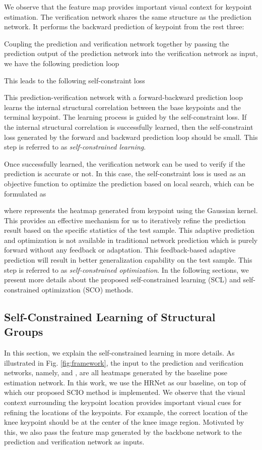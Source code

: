 \documentclass[runningheads]{llncs}
\begin{document}
We observe that the feature map   provides important visual context for keypoint estimation.
The verification network  shares the same structure as the prediction network. It performs the backward prediction of keypoint  from the rest three:

Coupling the prediction and verification network together by passing the 
prediction output  of the prediction network into the verification network as input, we have the following prediction loop

This leads to the following self-constraint loss

This  prediction-verification network with a forward-backward prediction loop
learns the internal structural correlation between the base keypoints and the terminal keypoint. The learning process is guided by the self-constraint loss. If the internal structural correlation is successfully learned, then the self-constraint loss 
 generated by the forward and backward prediction loop should be small. 
This step is referred to as \textit{self-constrained learning}.

Once successfully learned, the verification network  can be used to verify if the prediction  is accurate or not. 
In this case, the self-constraint loss is used as an objective function to optimize the prediction  based on local search, which can be formulated as 

where  represents the heatmap generated from keypoint  using the Gaussian kernel.
This provides an effective mechanism for us to iteratively refine the prediction result based on the specific statistics of  the test sample. This adaptive prediction and optimization is not available in traditional network prediction which is purely forward without any feedback or adaptation. This feedback-based adaptive prediction will result in better generalization capability on the test sample. 
This step is referred to as \textit{self-constrained optimization}.
In the following sections, we present more details about the proposed self-constrained learning (SCL) and self-constrained optimization (SCO) methods.

\subsection{Self-Constrained Learning of Structural Groups}
In this section, we explain the self-constrained learning in more details. 
As illustrated in Fig. \ref{fig:framework}, the input to the prediction and verification networks, namely,   and , are all heatmaps generated by the baseline pose estimation network. In this work, we use the HRNet \cite{DBLP:conf/cvpr/0009XLW19} as our baseline, on top of which our proposed SCIO method is implemented. We observe that the visual context surrounding the keypoint location provides important visual cues for  refining the locations of the keypoints. For example, the correct location of the knee keypoint should be at the center of the knee image region. Motivated by this, we also pass the feature map  generated by the backbone network to the prediction and verification network as inputs. 
\end{document}
